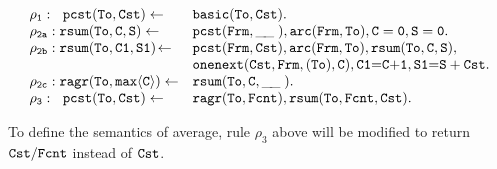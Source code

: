 \documentclass[11pt]{article}
\def\mt{\tt}
\newcommand{\cldl}{\[\begin{array}{ll}}
\newcommand{\eldl}{\end{array}\]\rm}
\newcommand{\prule}[2]{ \mt #1 \leftarrow & \mt #2 \\}
\def\pbody#1#2{ \mt #1 & \mt #2 \\}
\def\f--{\tt{ \_\!\_\;}}
\begin{document}



 \begin{example}
 \label{ex:sumbis}
\cldl
 \prule {\rho_1: ~\; pcst(To, Cst)}{basic(To, Cst).}
\prule{ \rho_{2a}: rsum(To, C, S)}{pcst(Frm, \f--), arc(Frm, To),
 C=0,  S=0.}
 \prule{ \rho_{2b}: rsum(To,C1, S1)\!} {pcst(Frm, Cst),  arc(Frm,To),  rsum(To, C, S),}
\pbody{}{onenext(Cst, Frm, (To), C), C1{=}C{+}1 ,S1{=}S+Cst.}
\prule{\rho_{2c}: ragr(To, max\langle C \rangle)}{rsum(To, C, \f--).}
\prule{\rho_3:~\; pcst(To, Cst)} { ragr(To, Fcnt), rsum(To, Fcnt, Cst).}
 \eldl
\end{example}
%
To define the semantics of  average,  rule   $\rho_3$ above will be modified to return $\tt Cst/Fcnt$ instead
of $\tt Cst$.
\end{document}
